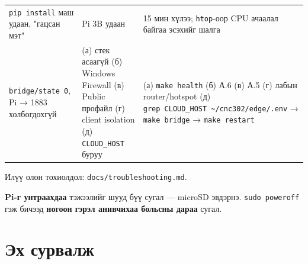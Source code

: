 \begin{longtable}[]{@{}lll@{}}
\begin{minipage}[t]{0.30\columnwidth}
\texttt{pip\ install} маш удаан, "гацсан мэт"\strut
\end{minipage} & \begin{minipage}[t]{0.30\columnwidth}\raggedright
Pi 3B удаан\strut
\end{minipage} & \begin{minipage}[t]{0.30\columnwidth}\raggedright
15 мин хүлээ; \texttt{htop}-оор CPU ачаалал байгаа эсэхийг шалга\strut
\end{minipage}\tabularnewline
\begin{minipage}[t]{0.30\columnwidth}\raggedright
\texttt{bridge/state\ 0}, Pi → 1883 холбогдохгүй\strut
\end{minipage} & \begin{minipage}[t]{0.30\columnwidth}\raggedright
(а) стек асаагүй (б) Windows Firewall (в) Public профайл (г) client isolation (д) \texttt{CLOUD\_HOST} буруу\strut
\end{minipage} & \begin{minipage}[t]{0.30\columnwidth}\raggedright
(а) \texttt{make\ health} (б) А.6 (в) А.5 (г) лабын router/hotspot (д) \texttt{grep\ CLOUD\_HOST\ \textasciitilde{}/cnc302/edge/.env} → \texttt{make\ bridge} → \texttt{make\ restart}\strut
\end{minipage}\tabularnewline
\bottomrule
\end{longtable}\endgroup

Илүү олон тохиолдол: \texttt{docs/\allowbreak{}troubleshooting.\allowbreak{}md}.

\textbf{Pi-г унтраахдаа} тэжээлийг шууд бүү сугал --- microSD эвдэрнэ. \texttt{sudo\ poweroff} гэж бичээд \textbf{ногоон гэрэл анивчихаа больсны дараа} сугал.

\hypertarget{ux44dux445-ux441ux443ux440ux432ux430ux43bux436}{%
\section{Эх сурвалж}\label{ux44dux445-ux441ux443ux440ux432ux430ux43bux436}}

